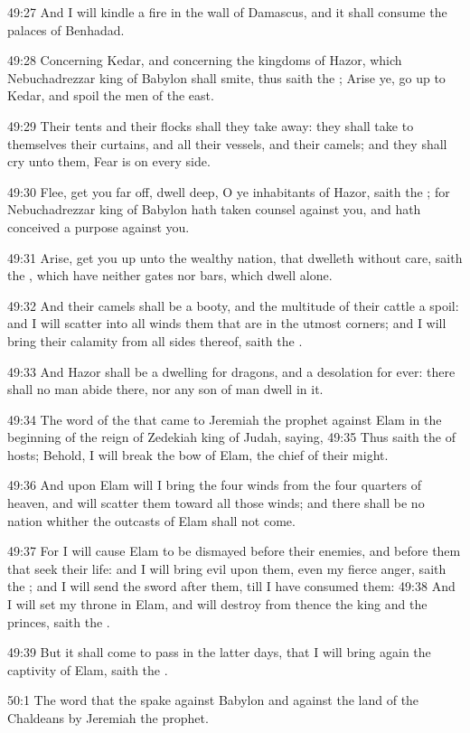 49:27 And I will kindle a fire in the wall of Damascus, and it shall
consume the palaces of Benhadad.

49:28 Concerning Kedar, and concerning the kingdoms of Hazor, which
Nebuchadrezzar king of Babylon shall smite, thus saith the \LORD; Arise
ye, go up to Kedar, and spoil the men of the east.

49:29 Their tents and their flocks shall they take away: they shall
take to themselves their curtains, and all their vessels, and their
camels; and they shall cry unto them, Fear is on every side.

49:30 Flee, get you far off, dwell deep, O ye inhabitants of Hazor,
saith the \LORD; for Nebuchadrezzar king of Babylon hath taken counsel
against you, and hath conceived a purpose against you.

49:31 Arise, get you up unto the wealthy nation, that dwelleth without
care, saith the \LORD, which have neither gates nor bars, which dwell
alone.

49:32 And their camels shall be a booty, and the multitude of their
cattle a spoil: and I will scatter into all winds them that are in the
utmost corners; and I will bring their calamity from all sides
thereof, saith the \LORD.

49:33 And Hazor shall be a dwelling for dragons, and a desolation for
ever: there shall no man abide there, nor any son of man dwell in it.

49:34 The word of the \LORD that came to Jeremiah the prophet against
Elam in the beginning of the reign of Zedekiah king of Judah, saying,
49:35 Thus saith the \LORD of hosts; Behold, I will break the bow of
Elam, the chief of their might.

49:36 And upon Elam will I bring the four winds from the four quarters
of heaven, and will scatter them toward all those winds; and there
shall be no nation whither the outcasts of Elam shall not come.

49:37 For I will cause Elam to be dismayed before their enemies, and
before them that seek their life: and I will bring evil upon them,
even my fierce anger, saith the \LORD; and I will send the sword after
them, till I have consumed them: 49:38 And I will set my throne in
Elam, and will destroy from thence the king and the princes, saith the
\LORD.

49:39 But it shall come to pass in the latter days, that I will bring
again the captivity of Elam, saith the \LORD.

50:1 The word that the \LORD spake against Babylon and against the land
of the Chaldeans by Jeremiah the prophet.

